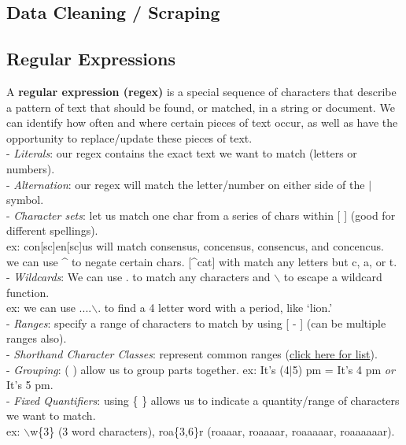 \documentclass[11pt, a4paper]{article}
\begin{document}
\begin{spacing}{1.1}
	\section{Data Cleaning / Scraping}
	\subsection{Regular Expressions}
	A \textbf{regular expression (regex)} is a special sequence of characters that describe a pattern of text that should be found, or matched, in a string or document. We can identify how often and where certain pieces of text occur, as well as have the opportunity to replace/update these pieces of text. \vspace*{1mm} \\
	\hspace*{3mm} - \textit{Literals}: our regex contains the exact text we want to match (letters or numbers). \\
	\hspace*{3mm} - \textit{Alternation}: our regex will match the letter/number on either side of the $|$ symbol. \\
	\hspace*{3mm} - \textit{Character sets}: let us match one char from a series of chars within [ ] (good for different spellings). \\
	\hspace*{33mm} ex: con[sc]en[sc]us will match consensus, concensus, consencus, and concencus. \\
	\hspace*{33mm} we can use \^{} to negate certain chars. [\^{}cat] with match any letters but c, a, or t. \\
	\hspace*{3mm} - \textit{Wildcards}: We can use . to match any characters and $\backslash$ to escape a wildcard function. \\
	\hspace*{25mm} ex: we can use ....$\backslash$. to find a 4 letter word with a period, like `lion.' \\
	\hspace*{3mm} - \textit{Ranges}: specify a range of characters to match by using [ - ] (can be multiple ranges also).\\
	\hspace*{3mm} - \textit{Shorthand Character Classes}: represent common ranges (\href{https://www.regular-expressions.info/shorthand.html}{click here for list}). \\
	\hspace*{3mm} - \textit{Grouping}: ( ) allow us to group parts together. ex: It's (4$|$5) pm = It's 4 pm \textit{or} It's 5 pm. \\
	\hspace*{3mm} - \textit{Fixed Quantifiers}: using \{ \} allows us to indicate a quantity/range of characters we want to match. \\
	\hspace*{38mm} ex: $\backslash$w\{3\} (3 word characters), roa\{3,6\}r (roaaar, roaaaar, roaaaaar, roaaaaaar).\newpage


\end{spacing}
\end{document}
